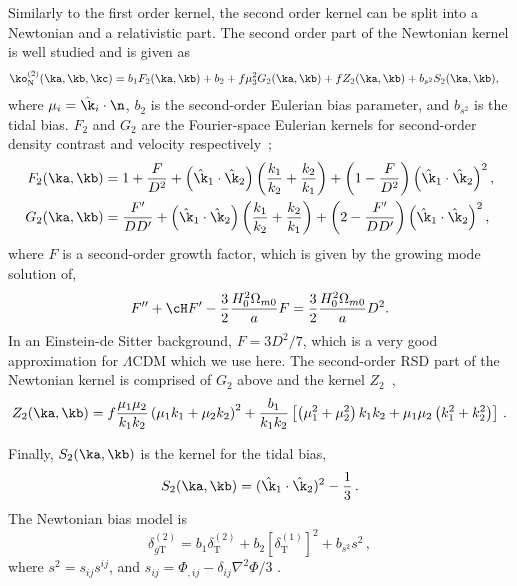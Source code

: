 Similarly to the first order kernel, the second order kernel can be split into a Newtonian and a relativistic part. The second order part of the Newtonian kernel is well studied and is given as~\cite{Bernardeau_2002,Karagiannis_2018,Scoccimarro_1999,Verde_1998}
\begin{align}\label{newt2o}
	\ko_\mathrm{N}^{(2)}(\ka, \kb, \kc) &= b_1 F_2(\ka,\kb) + b_2 + f \mu_3^2 G_2(\ka,\kb) + f Z_2(\ka,\kb) + b_{s^2} S_2(\ka,\kb),
\end{align}
where \(\mu_i = \hat\k_i \cdot \n \), \( b_2\) is the second-order Eulerian bias parameter, and \(b_{s^2} \) is the tidal bias. \(F_2\) and \(G_2\) are the Fourier-space Eulerian kernels for second-order density contrast and velocity respectively~\cite{Jolicoeur:2017nyt,Villa:2015ppa}; 
\begin{align}
F_2(\ka,\kb) &= 1 + \frac{F}{D^2} + \left(\hat{\k}_1 \cdot \hat{\k}_2 \right)\left( \frac{k_1}{k_2} + \frac{k_2}{k_1}\right) + \left( 1-\frac{F}{D^2}\right) \left(\hat{\k}_1 \cdot \hat{\k}_2 \right)^2,\nonumber \\
G_2(\ka,\kb) &= \frac{F'}{D D'} + \left(\hat{\k}_1 \cdot \hat{\k}_2\right)\left(\frac{k_1}{k_2} + \frac{k_2}{k_1} \right) + \left( 2 - \frac{F'}{D D'} \right) \left(\hat{\k}_1 \cdot \hat{\k}_2\right)^2,
\end{align}
where \(F\) is a second-order growth factor, which is given by the growing mode solution of,
\begin{equation}
F'' + \cH F' - \frac{3}{2}\frac{H_0^2 \Omega_{m0}}{a} F = \frac{3}{2}\frac{H_0^2 \Omega_{m0}}{a} D^2.
\end{equation}
 In an Einstein-de Sitter background, \(F= 3 D^2 / 7\), which is a very good approximation for \(\Lambda\)CDM which we use here. The second-order RSD part of the Newtonian kernel is comprised of \(G_2\) above and the kernel \(Z_2\)~\cite{Verde_1998,Scoccimarro_1999},
\begin{equation}
	Z_2(\ka,\kb) = f \frac{\mu_1 \mu_2}{k_1 k_2}\left( \mu_1 k_1 + \mu_2 k_2 \right)^2 + \frac{b_1 }{k_1 k_2} \left[ \left( \mu_1^2 + \mu_2^2 \right)k_1 k_2 + \mu_1 \mu_2 \left( k_1^2 + k_2^2 \right) \right]\,.
\end{equation}

 Finally, \(S_2(\ka,\kb)\) is the kernel for the tidal bias,
\begin{equation}
	S_2(\ka,\kb) = (\hat{\k}_1 \cdot \hat{\k}_2)^2 - \frac{1}{3}\,.
\end{equation}
The Newtonian bias model is 
\begin{equation}\label{eq:newtbiasmodel}
	\delta_{g\mathrm{T}}^{(2)} = b_1 \delta_\mathrm{T}^{(2)} + b_2 \left[\delta_\mathrm{T}^{(1)}\right]^2 + b_{s^2} s^2\,,
\end{equation}
where \( s^2 = s_{ij}s^{ij}\), and \( s_{ij} = \Phi_{,ij} - \delta_{ij}\nabla^2 \Phi /3\) . 

